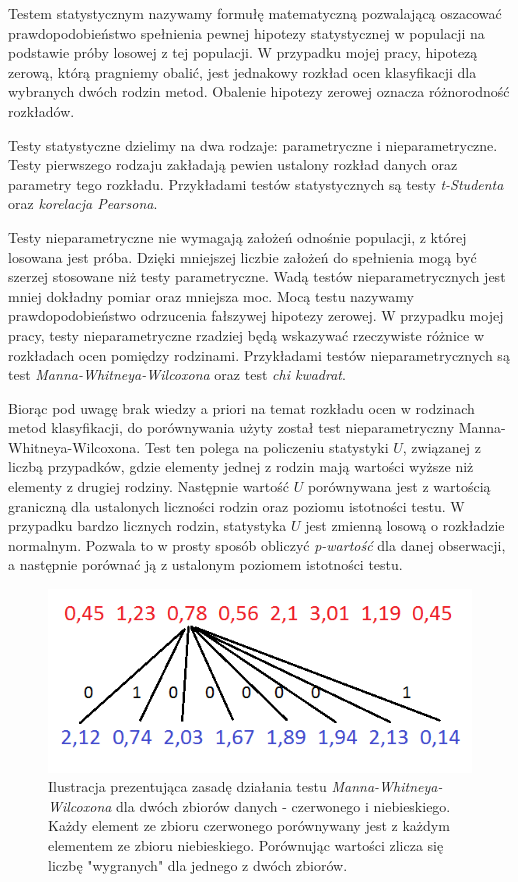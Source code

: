 \documentclass[../thesis.tex]{subfiles}
\begin{document}
Testem statystycznym nazywamy formułę matematyczną pozwalającą oszacować prawdopodobieństwo spełnienia pewnej hipotezy statystycznej w populacji na podstawie próby losowej z tej populacji. W przypadku mojej pracy, hipotezą zerową, którą pragniemy obalić, jest jednakowy rozkład ocen klasyfikacji dla wybranych dwóch rodzin metod. Obalenie hipotezy zerowej oznacza różnorodność rozkładów.

Testy statystyczne dzielimy na dwa rodzaje: parametryczne i nieparametryczne. Testy pierwszego rodzaju zakładają pewien ustalony rozkład danych oraz parametry tego rozkładu. Przykładami testów statystycznych są testy \emph{t-Studenta} oraz \emph{korelacja Pearsona}.

Testy nieparametryczne nie wymagają założeń odnośnie populacji, z której losowana jest próba. Dzięki mniejszej liczbie założeń do spełnienia mogą być szerzej stosowane niż testy parametryczne. Wadą testów nieparametrycznych jest mniej dokładny pomiar oraz mniejsza moc. Mocą testu nazywamy prawdopodobieństwo odrzucenia fałszywej hipotezy zerowej. W przypadku mojej pracy, testy nieparametryczne rzadziej będą wskazywać rzeczywiste różnice w rozkładach ocen pomiędzy rodzinami. Przykładami testów nieparametrycznych są test \emph{Manna-Whitneya-Wilcoxona} oraz test \emph{chi kwadrat}. 

Biorąc pod uwagę brak wiedzy a priori na temat rozkładu ocen w rodzinach metod klasyfikacji, do porównywania użyty został test nieparametryczny Manna-Whitneya-Wilcoxona. Test ten polega na policzeniu statystyki $U$, związanej z liczbą przypadków, gdzie elementy jednej z rodzin mają wartości wyższe niż elementy z drugiej rodziny. Następnie wartość $U$ porównywana jest z wartością graniczną dla ustalonych liczności rodzin oraz poziomu istotności testu. W przypadku bardzo licznych rodzin, statystyka $U$ jest zmienną losową o rozkładzie normalnym. Pozwala to w prosty sposób obliczyć \emph{p-wartość} dla danej obserwacji, a następnie porównać ją z ustalonym poziomem istotności testu.

\begin{figure}[h]
\centering
\includegraphics[height=.15\textheight]{umann.png}
\caption{Ilustracja prezentująca zasadę działania testu \emph{Manna-Whitneya-Wilcoxona} dla dwóch zbiorów danych - czerwonego i niebieskiego. Każdy element ze zbioru czerwonego porównywany jest z każdym elementem ze zbioru niebieskiego. Porównując wartości zlicza się liczbę "wygranych" dla jednego z dwóch zbiorów. }
\label{classification:umann}
\end{figure}
\end{document}
